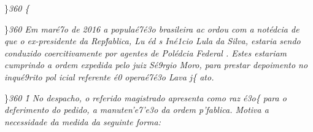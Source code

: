 \}\pard \ltrpar\qj {}\sl360\widctlpar\wrapdefault\faauto{} \{\rtlch{}
 \ltrch{} 
\par \}\pard \ltrpar\qj {}\sl360\widctlpar\wrapdefault\faauto{} {\rtlch{}  \ltrch{}  Em mar\'e7o de 2016 a popula\'e7\'e3o brasileira ac}{\rtlch{}  \ltrch{} 
 ordou com a not\'edcia de que o }{\rtlch{}  \ltrch{}  ex-presidente}{\rtlch{}  \ltrch{}   da Rep\'fablica, Lu}{\rtlch{}  \ltrch{}  \'ed}{
\rtlch{}  \ltrch{}  s In\'e1cio Lula da Silva, estaria sendo conduzido coercitivamente por agentes de Pol\'edcia Federal}{\rtlch{}  \ltrch{}  . Estes estariam cumprindo}{\rtlch{}  
\ltrch{}   a ordem expedida pelo juiz S\'e9rgio Moro, para prestar depoimento no inqu\'e9rito pol}{\rtlch{}  \ltrch{}  icial referente \'e0 opera\'e7\'e3o Lava}{\rtlch{}  \ltrch{} 
 j}\{\rtlch{}  \ltrch{}
 ato.
\par \}\pard\plain \ltrpar{}\qj {}\sl360\widctlpar\wrapdefault\aspalpha\aspnum\faauto\adjustright{} \rtlch{}  \ltrch{} 
\f1\cgrid{} {\rtlch{}  \ltrch{}  No despacho, o referido magistrado apresenta como raz}{\rtlch{}  \ltrch{}  \'e3o}\{\rtlch{}
 \ltrch{}  para o deferimento do
pedido, a manuten'e7'e3o da ordem p'fablica. Motiva a necessidade da
medida da seguinte forma:
